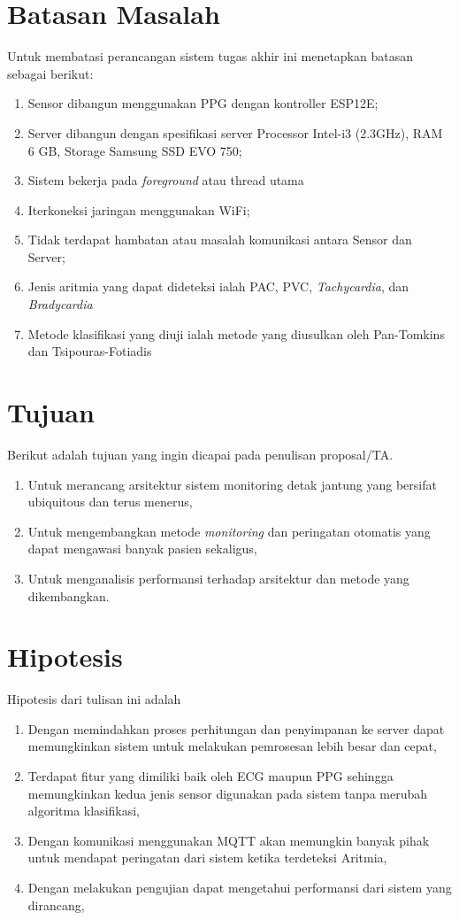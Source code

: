 \section{Batasan Masalah}
Untuk membatasi perancangan sistem tugas akhir ini menetapkan batasan sebagai berikut:
\begin{enumerate}
	\item Sensor dibangun menggunakan PPG dengan kontroller ESP12E;
    \item Server dibangun dengan spesifikasi server Processor Intel-i3 (2.3GHz), RAM 6 GB, Storage Samsung SSD EVO 750;
	\item Sistem bekerja pada \textit{foreground} atau thread utama
    \item Iterkoneksi jaringan menggunakan WiFi;
    \item Tidak terdapat hambatan atau masalah komunikasi antara Sensor dan Server;
    \item Jenis aritmia yang dapat dideteksi ialah PAC, PVC, \textit{Tachycardia}, dan \textit{Bradycardia}
    \item Metode klasifikasi yang diuji ialah metode yang diusulkan oleh Pan-Tomkins dan Tsipouras-Fotiadis
\end{enumerate}
\section{Tujuan}
Berikut adalah tujuan yang ingin dicapai pada penulisan proposal/TA.
\begin{enumerate}
    \item Untuk merancang arsitektur sistem monitoring detak jantung yang bersifat ubiquitous dan terus menerus,
    \item Untuk mengembangkan metode \textit{monitoring} dan peringatan otomatis yang dapat mengawasi banyak pasien sekaligus,
    \item Untuk menganalisis performansi terhadap arsitektur dan metode yang dikembangkan.
\end{enumerate}
\section{Hipotesis}
Hipotesis dari tulisan ini adalah
\begin{enumerate}
    \item Dengan memindahkan proses perhitungan dan penyimpanan ke server dapat memungkinkan sistem untuk melakukan pemrosesan lebih besar dan cepat,
    \item Terdapat fitur yang dimiliki baik oleh ECG maupun PPG sehingga memungkinkan kedua jenis sensor digunakan pada sistem tanpa merubah algoritma klasifikasi,
    \item Dengan komunikasi menggunakan MQTT akan memungkin banyak pihak untuk mendapat peringatan dari sistem ketika terdeteksi Aritmia,
	\item Dengan melakukan pengujian dapat mengetahui performansi dari sistem yang dirancang,
\end{enumerate}

